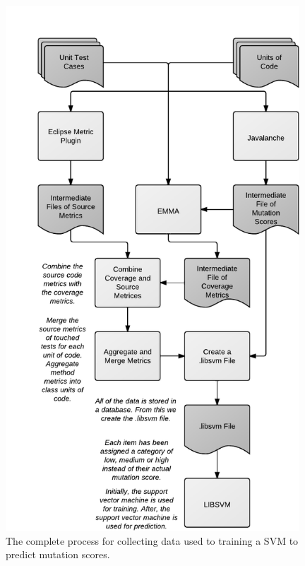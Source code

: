 \begin{figure}[h]
  \centering
  \includegraphics[width=11cm]{figures/process.pdf}
  \caption{The complete process for collecting data used to training a SVM to predict mutation scores.}
  \label{fig:process}
\end{figure}

